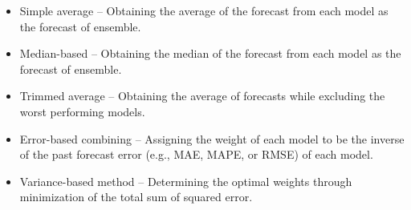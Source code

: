 \begin{itemize}
\item Simple average -- Obtaining the average of the forecast from each model as the forecast of ensemble.
\item Median-based -- Obtaining the median of the forecast from each model as the forecast of ensemble.
\item Trimmed average -- Obtaining the average of forecasts while excluding the worst performing models.
\item Error-based combining -- Assigning the weight of each model to be the inverse of the past forecast error (e.g., MAE, MAPE, or RMSE) of each model.
\item Variance-based method -- Determining the optimal weights through minimization of the total sum of squared error.
\end{itemize}